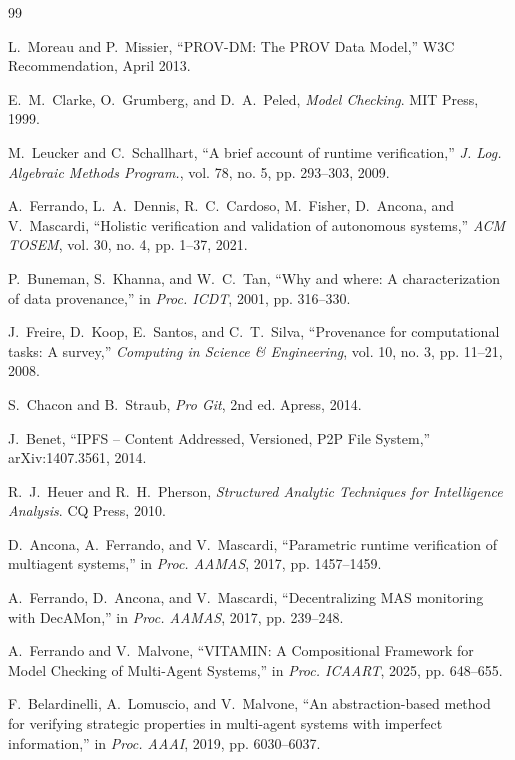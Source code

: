 \documentclass[11pt,twocolumn]{article}
\begin{document}
\begin{thebibliography}{99}

L.~Moreau and P.~Missier, ``PROV-DM: The PROV Data Model,'' W3C Recommendation, April 2013.

E.~M.~Clarke, O.~Grumberg, and D.~A.~Peled, \textit{Model Checking}. MIT Press, 1999.

M.~Leucker and C.~Schallhart, ``A brief account of runtime verification,'' \textit{J. Log. Algebraic Methods Program.}, vol. 78, no. 5, pp. 293--303, 2009.

A.~Ferrando, L.~A.~Dennis, R.~C.~Cardoso, M.~Fisher, D.~Ancona, and V.~Mascardi, ``Holistic verification and validation of autonomous systems,'' \textit{ACM TOSEM}, vol. 30, no. 4, pp. 1--37, 2021.

P.~Buneman, S.~Khanna, and W.~C.~Tan, ``Why and where: A characterization of data provenance,'' in \textit{Proc. ICDT}, 2001, pp. 316--330.

J.~Freire, D.~Koop, E.~Santos, and C.~T.~Silva, ``Provenance for computational tasks: A survey,'' \textit{Computing in Science \& Engineering}, vol. 10, no. 3, pp. 11--21, 2008.

S.~Chacon and B.~Straub, \textit{Pro Git}, 2nd ed. Apress, 2014.

J.~Benet, ``IPFS -- Content Addressed, Versioned, P2P File System,'' arXiv:1407.3561, 2014.

R.~J.~Heuer and R.~H.~Pherson, \textit{Structured Analytic Techniques for Intelligence Analysis}. CQ Press, 2010.

D.~Ancona, A.~Ferrando, and V.~Mascardi, ``Parametric runtime verification of multiagent systems,'' in \textit{Proc. AAMAS}, 2017, pp. 1457--1459.

A.~Ferrando, D.~Ancona, and V.~Mascardi, ``Decentralizing MAS monitoring with DecAMon,'' in \textit{Proc. AAMAS}, 2017, pp. 239--248.

A.~Ferrando and V.~Malvone, ``VITAMIN: A Compositional Framework for Model Checking of Multi-Agent Systems,'' in \textit{Proc. ICAART}, 2025, pp. 648--655.

F.~Belardinelli, A.~Lomuscio, and V.~Malvone, ``An abstraction-based method for verifying strategic properties in multi-agent systems with imperfect information,'' in \textit{Proc. AAAI}, 2019, pp. 6030--6037.


\end{thebibliography}
\end{document}
